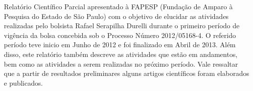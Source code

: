  Relatório Científico Parcial apresentado à FAPESP (Fundação de Amparo à Pesquisa do Estado de São Paulo) com o objetivo de elucidar as atividades realizadas  
 pelo bolsista Rafael Serapilha Durelli durante o primeiro período de vigência da bolsa concebida sob o Processo Número 2012/05168-4. 
 O referido período teve inicio em Junho de 2012 e foi finalizado em Abril de 2013. 
 Além disso, este relatório também descreve as atividades que estão em andamentos, bem como as atividades a serem realizadas no próximo período. 
 Vale ressaltar que a partir de resultados preliminares alguns artigos científicos foram elaborados e publicados.